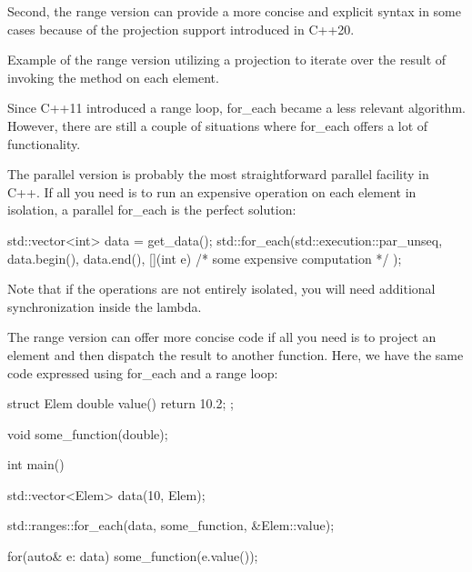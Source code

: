 Second, the range version can provide a more concise and explicit syntax in some cases because of the projection support introduced in C++20.

\begin{box-note}
\footnotesize Example of the range version  utilizing a projection to iterate over the result of invoking the method  on each element.
\tcblower
{}
\end{box-note}

\if
\else

 Since C++11 introduced a range loop, for\_each became a less relevant algorithm. However, there are still a couple of situations where for\_each offers a lot of functionality.

The parallel version is probably the most straightforward parallel facility in C++. If all you need is to run an expensive operation on each element in isolation, a parallel for\_each is the perfect solution:

\begin{box-note}
\begin{cppcode}
std::vector<int> data = get_data();
std::for_each(std::execution::par_unseq, 
    data.begin(), data.end(),
    [](int e) { /* some expensive computation */ });
\end{cppcode}
\end{box-note}

Note that if the operations are not entirely isolated, you will need additional synchronization inside the lambda.

The range version can offer more concise code if all you need is to project an element and then dispatch the result to another function. Here, we have the same code expressed using for\_each and a range loop:

\begin{box-note}
\begin{cppcode}
struct Elem {
    double value() { return 10.2; }
};

void some_function(double);

int main() {
    std::vector<Elem> data(10, Elem{});
    
    std::ranges::for_each(data, some_function, &Elem::value);

    for(auto& e: data) {
        some_function(e.value());
    }
}
\end{cppcode}
\end{box-note}

